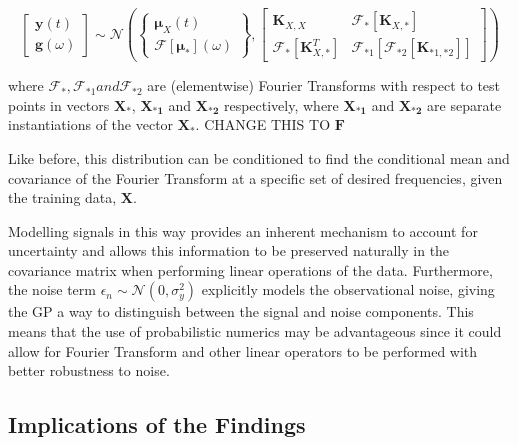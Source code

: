 \documentclass[12pt]{article}
\begin{document}
    \begin{equation}
        \left[
            \begin{array}{c}
                \mathbf{y}(t) \\
                \mathbf{g}(\omega)
            \end{array}
            \right]
        \sim \mathcal{N} \left(
        \left\{
        \begin{array}{c}
            \boldsymbol{\mu}_X(t) \\
            \mathcal{F}[{\boldsymbol{\mu}_*}](\omega)
        \end{array}
        \right\},
        \left[
            \begin{array}{cc}
                \mathbf{K}_{X,X} & \mathcal{F}_{*} [\boldsymbol{K}_{X,*}] \\
                \mathcal{F}_{*} [\boldsymbol{K}_{X,*}^T] & \mathcal{F}_{*1} [\mathcal{F}_{*2} [\boldsymbol{K}_{*1,*2}]]
            \end{array}
            \right]
        \right)\label{eq:linear-trans}
    \end{equation}

    \noindent where $\mathcal{F}_*, \mathcal{F}_{*1} and \mathcal{F}_{*2}$ are (elementwise) Fourier Transforms with respect to test points in vectors $\mathbf{X_{*}}$, $\mathbf{X_{*1}}$ and $\mathbf{X_{*2}}$ respectively, where $\mathbf{X_{*1}}$ and $\mathbf{X_{*2}}$ are separate instantiations of the vector $\mathbf{X_{*}}$. CHANGE THIS TO $\mathbf{F}$

    Like before, this distribution can be conditioned to find the conditional mean and covariance of the Fourier Transform at a specific set of desired frequencies, given the training data, $\mathbf{X}$.


    Modelling signals in this way provides an inherent mechanism to account for uncertainty and allows this information to be preserved naturally in the covariance matrix when performing linear operations of the data.
    Furthermore, the noise term  $\epsilon_n \sim \mathcal{N}(0, \sigma^2_y)$ explicitly models the observational noise, giving the GP a way to distinguish between the signal and noise components.
    This means that the use of probabilistic numerics may be advantageous since it could allow for Fourier Transform and other linear operators to be performed with better robustness to noise.

    \subsection{Implications of the Findings}
\end{document}
